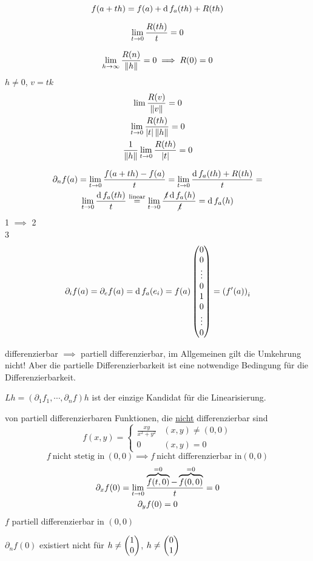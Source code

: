 \begin{Bew}
  \[f(a+th)=f(a)+\operatorname{d} f_a(th)+R(th)\]
  \begin{Lem}
    \[\displaystyle\lim_{t\rightarrow0}\frac{R(th)}{t}=0\]
  \end{Lem}
  \begin{Bew}
    \[\displaystyle\lim_{h\rightarrow\infty}\frac{R(n)}{\left\| h \right\|}=0\implies R(0)=0\]
    $h\neq 0$, $v=tk$
    \begin{gather*}
      \lim\frac{R(v)}{\left\| v \right\|}=0\\
      \displaystyle\lim_{t\rightarrow0}\frac{R(th)}{\left| t \right|\left\| h \right\|}=0\\
      \frac{1}{\left\| h \right\|}\displaystyle\lim_{t\rightarrow0}\frac{R(th)}{\left| t \right|}=0
    \end{gather*}
  \end{Bew}
  \begin{gather*}
    \partial_nf(a)=\displaystyle\lim_{t\rightarrow0}\frac{f(a+th)-f(a)}{t}=\displaystyle\lim_{t\rightarrow0}\frac{\operatorname{d} f_a(th)+R(th)}{t}=\\
    \displaystyle\lim_{t\rightarrow0}\frac{\operatorname{d} f_a(th)}{t}\stackrel{\text{linear}}{=}\displaystyle\lim_{t\rightarrow0}\frac{\not t \operatorname{d} f_a(h)}{\not t}=\operatorname{d} f_a(h)
  \end{gather*}
  1 $\implies$ 2\\
  3
  \begin{gather*}
    \partial_if(a)=\partial_ef(a)=\operatorname{d} f_a(e_i)=f(a)\begin{pmatrix}0\\0\\\vdots\\0\\1\\0\\\vdots\\0\end{pmatrix}=\left( f'(a) \right)_i
  \end{gather*}
\end{Bew}
\begin{Bem}
  differenzierbar $\implies$ partiell differenzierbar, im Allgemeinen gilt die Umkehrung nicht! Aber die partielle Differenzierbarkeit ist eine notwendige Bedingung für die Differenzierbarkeit.
\end{Bem}
\begin{Bem}
  $Lh=\left( \partial_1f_1,\cdots,\partial_nf \right)h$ ist der einzige Kandidat für die Linearisierung.
\end{Bem}
\begin{Bsp}
  von partiell differenzierbaren Funktionen, die \underline{nicht} differenzierbar sind
  \[f(x,y)=\begin{cases}
    \frac{xy}{x^2+y^2}&(x,y)\neq (0,0)\\
    0&(x,y)=0
  \end{cases}\]
  \[f\ \text{nicht stetig in}\ (0,0)\implies f\ \text{nicht differenzierbar in} (0,0)\]
  \begin{gather*}
    \partial_xf(0)=\displaystyle\lim_{t\rightarrow0}\frac{\overbrace{f(t,0)}^{=0}-\overbrace{f(0,0)}^{=0}}{t}=0\\
    \partial_yf(0)=0
  \end{gather*}
  $f$ partiell differenzierbar in $(0,0)$
\end{Bsp}
\begin{Bem}
  $\partial_nf(0)$ existiert nicht für $h\neq\begin{pmatrix}1\\0\end{pmatrix}$, $h\neq\begin{pmatrix}0\\1\end{pmatrix}$
\end{Bem}

